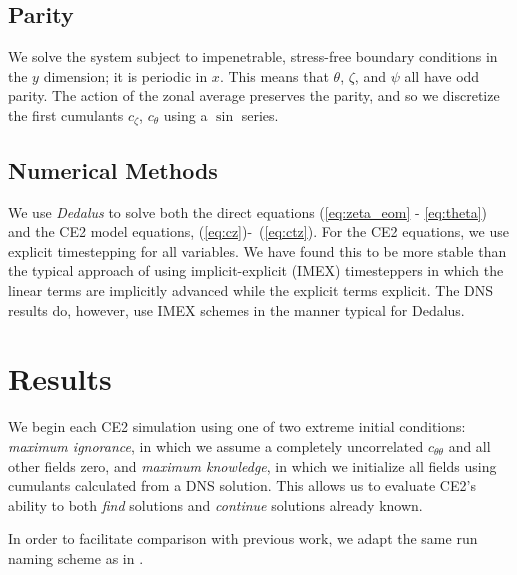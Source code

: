 \documentclass{jfm}
\newcommand{\cz}{c_{\zeta}}
\newcommand{\ct}{c_{\theta}}
\newcommand{\ctt}{c_{\theta \theta}}
\begin{document}
\subsection{Parity}
\label{sec:parity}

We solve the system subject to impenetrable, stress-free boundary conditions in the $y$ dimension; it is periodic in $x$. 
This means that $\theta$, $\zeta$, and $\psi$ all have odd parity.
The action of the zonal average preserves the parity, and so we discretize the first cumulants $\cz$, $\ct$ using a $\sin$ series. 

\subsection{Numerical Methods}
\label{sec:numerical}

We use \emph{Dedalus} \citep{2020PhRvR...2b3068B} to solve both the direct equations (\ref{eq:zeta_eom} - \ref{eq:theta}) and the CE2 model equations, (\ref{eq:cz})-~(\ref{eq:ctz}).
For the CE2 equations, we use explicit timestepping for all variables.
We have found this to be more stable than the typical approach of using implicit-explicit (IMEX) timesteppers in which the linear terms are implicitly advanced while the explicit terms explicit.
The DNS results do, however, use IMEX schemes in the manner typical for Dedalus.


\section{Results}
\label{sec:results}

We begin each CE2 simulation using one of two extreme initial conditions: \emph{maximum ignorance}, in which we assume a completely uncorrelated $\ctt$ and all other fields zero, and \emph{maximum knowledge}, in which we initialize all fields using cumulants calculated from a DNS solution. This allows us to evaluate CE2's ability to both \emph{find} solutions and \emph{continue} solutions already known.

In order to facilitate comparison with previous work, we adapt the same run naming scheme as in \citet{2018RSPSA.47480422T}.
\end{document}
